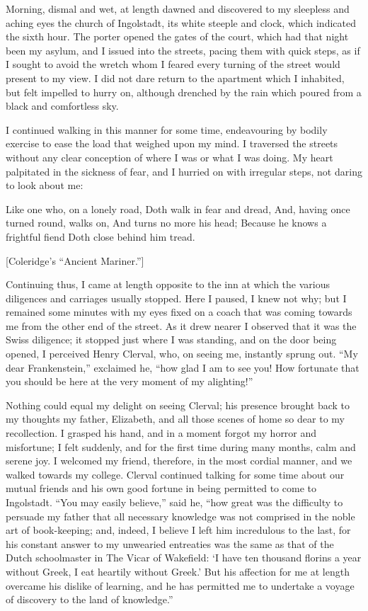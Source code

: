 \documentclass[12pt,openright]{book}
\begin{document}
Morning, dismal and wet, at length dawned and discovered to my sleepless and aching eyes the church of Ingolstadt, its white steeple and clock, which indicated the sixth hour. The porter opened the gates of the court, which had that night been my asylum, and I issued into the streets, pacing them with quick steps, as if I sought to avoid the wretch whom I feared every turning of the street would present to my view. I did not dare return to the apartment which I inhabited, but felt impelled to hurry on, although drenched by the rain which poured from a black and comfortless sky.

I continued walking in this manner for some time, endeavouring by bodily exercise to ease the load that weighed upon my mind. I traversed the streets without any clear conception of where I was or what I was doing. My heart palpitated in the sickness of fear, and I hurried on with irregular steps, not daring to look about me:

Like one who, on a lonely road, Doth walk in fear and dread, And, having once turned round, walks on, And turns no more his head; Because he knows a frightful fiend Doth close behind him tread.

[Coleridge’s “Ancient Mariner.”]

Continuing thus, I came at length opposite to the inn at which the various diligences and carriages usually stopped. Here I paused, I knew not why; but I remained some minutes with my eyes fixed on a coach that was coming towards me from the other end of the street. As it drew nearer I observed that it was the Swiss diligence; it stopped just where I was standing, and on the door being opened, I perceived Henry Clerval, who, on seeing me, instantly sprung out. “My dear Frankenstein,” exclaimed he, “how glad I am to see you! How fortunate that you should be here at the very moment of my alighting!”

Nothing could equal my delight on seeing Clerval; his presence brought back to my thoughts my father, Elizabeth, and all those scenes of home so dear to my recollection. I grasped his hand, and in a moment forgot my horror and misfortune; I felt suddenly, and for the first time during many months, calm and serene joy. I welcomed my friend, therefore, in the most cordial manner, and we walked towards my college. Clerval continued talking for some time about our mutual friends and his own good fortune in being permitted to come to Ingolstadt. “You may easily believe,” said he, “how great was the difficulty to persuade my father that all necessary knowledge was not comprised in the noble art of book-keeping; and, indeed, I believe I left him incredulous to the last, for his constant answer to my unwearied entreaties was the same as that of the Dutch schoolmaster in The Vicar of Wakefield: ‘I have ten thousand florins a year without Greek, I eat heartily without Greek.’ But his affection for me at length overcame his dislike of learning, and he has permitted me to undertake a voyage of discovery to the land of knowledge.”
\end{document}
